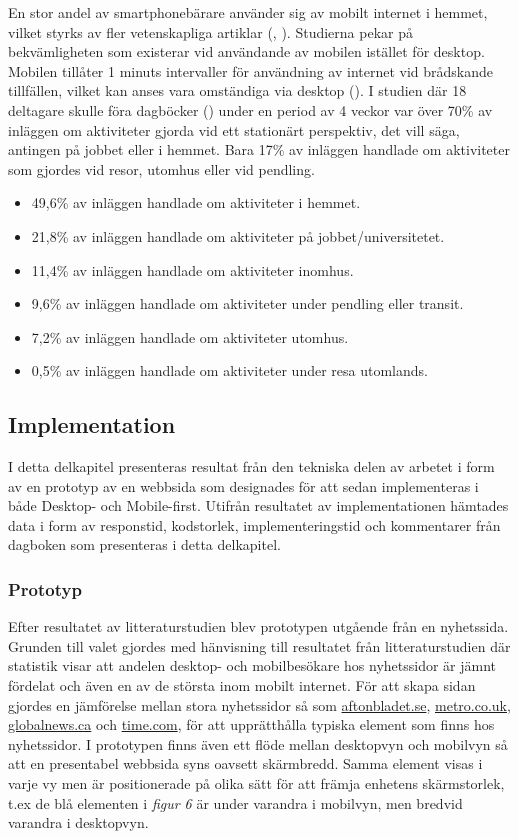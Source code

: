 \documentclass[11pt]{article}
\begin{document}
En stor andel av smartphonebärare använder sig av mobilt internet i hemmet, vilket styrks av fler vetenskapliga artiklar (\cite{mobilewebsearch}, \cite{mobilefirstluke}). Studierna pekar på bekvämligheten som existerar vid användande av mobilen istället för desktop. Mobilen tillåter 1 minuts intervaller för användning av internet vid brådskande tillfällen, vilket kan anses vara omständiga via desktop (\cite{mobilewebsearch}). I studien där 18 deltagare skulle föra dagböcker (\cite{mobilewebsearch}) under en period av 4 veckor var över 70\% av inläggen om aktiviteter gjorda vid ett stationärt perspektiv, det vill säga, antingen på jobbet eller i hemmet. Bara 17\% av inläggen handlade om aktiviteter som gjordes vid resor, utomhus eller vid pendling.
\\
\begin{itemize}
	\item{49,6\% av inläggen handlade om aktiviteter i hemmet.}
	\item{21,8\% av inläggen handlade om aktiviteter på jobbet/universitetet.}
	\item{11,4\% av inläggen handlade om aktiviteter inomhus.}
	\item{9,6\% av inläggen handlade om aktiviteter under pendling eller transit.}
	\item{7,2\% av inläggen handlade om aktiviteter utomhus.}
	\item{0,5\% av inläggen handlade om aktiviteter under resa utomlands.}
\end{itemize}
\bigskip

\subsection{Implementation}
I detta delkapitel presenteras resultat från den tekniska delen av arbetet i form av en prototyp av en webbsida som designades för att sedan implementeras  i både Desktop- och Mobile-first. Utifrån resultatet av implementationen hämtades data i form av responstid, kodstorlek, implementeringstid och kommentarer från dagboken som presenteras i detta delkapitel.

\subsubsection{Prototyp}
Efter resultatet av litteraturstudien blev prototypen utgående från en nyhetssida. Grunden till valet gjordes med hänvisning till resultatet från litteraturstudien där statistik visar att andelen desktop- och mobilbesökare hos nyhetssidor är jämnt fördelat och även en av de största inom mobilt internet. För att skapa sidan gjordes en jämförelse mellan stora nyhetssidor så som \href{http://www.aftonbladet.se}{aftonbladet.se}, \href{http://www.metro.co.uk}{metro.co.uk}, \href{http://www.globalnews.ca}{globalnews.ca} och \href{http://www.time.com}{time.com}, för att upprätthålla typiska element som finns hos nyhetssidor. I prototypen finns även ett flöde mellan desktopvyn och mobilvyn så att en presentabel webbsida syns oavsett skärmbredd. Samma element visas i varje vy men är positionerade på olika sätt för att främja enhetens skärmstorlek, t.ex de blå elementen i \textit{figur 6} är under varandra i mobilvyn, men bredvid varandra i desktopvyn.
\end{document}
